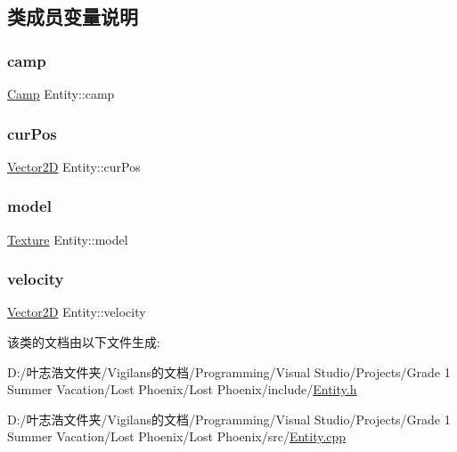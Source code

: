 \subsection{类成员变量说明}
\mbox{\label{class_entity_a5326accd49d3817310ec90692b9da3df}} 
\subsubsection{\texorpdfstring{camp}{camp}}
{\footnotesize\ttfamily \hyperlink{_entity_8h_ad54c4fe39f1c51b786c24ae0b7763b44}{Camp} Entity\+::camp\hspace{0.3cm}{\ttfamily [protected]}}

\mbox{\label{class_entity_a5031aa6b058f2231daad16b35e3d536d}} 
\subsubsection{\texorpdfstring{cur\+Pos}{curPos}}
{\footnotesize\ttfamily \hyperlink{_vector2_d_8hpp_aa1f1145650f1dd9bddf7335ec6434d7c}{Vector2D} Entity\+::cur\+Pos\hspace{0.3cm}{\ttfamily [protected]}}

\mbox{\label{class_entity_a22ccba8fb86e5b4e10b2c33b6f56d238}} 
\subsubsection{\texorpdfstring{model}{model}}
{\footnotesize\ttfamily \hyperlink{struct_texture}{Texture} Entity\+::model\hspace{0.3cm}{\ttfamily [protected]}}

\mbox{\label{class_entity_a386d25b56772b8913eb3e5adc636f6e0}} 
\subsubsection{\texorpdfstring{velocity}{velocity}}
{\footnotesize\ttfamily \hyperlink{_vector2_d_8hpp_aa1f1145650f1dd9bddf7335ec6434d7c}{Vector2D} Entity\+::velocity\hspace{0.3cm}{\ttfamily [protected]}}



该类的文档由以下文件生成\+:\begin{DoxyCompactItemize}
\item 
D\+:/叶志浩文件夹/\+Vigilans的文档/\+Programming/\+Visual Studio/\+Projects/\+Grade 1 Summer Vacation/\+Lost Phoenix/\+Lost Phoenix/include/\hyperlink{_entity_8h}{Entity.\+h}\item 
D\+:/叶志浩文件夹/\+Vigilans的文档/\+Programming/\+Visual Studio/\+Projects/\+Grade 1 Summer Vacation/\+Lost Phoenix/\+Lost Phoenix/src/\hyperlink{_entity_8cpp}{Entity.\+cpp}\end{DoxyCompactItemize}
